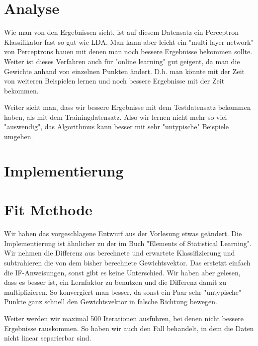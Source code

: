\section*{Analyse}
Wie man von den Ergebnissen sieht, ist auf diesem Datensatz ein Perceptron Klassifikator fast so gut wie LDA.
Man kann aber leicht ein "multi-layer network" von Perceptrons bauen mit denen man noch bessere Ergebnisse bekommen
sollte. Weiter ist dieses Verfahren auch für "online learning" gut geigent, da man die Gewichte anhand von einzelnen
Punkten ändert. D.h. man könnte mit der Zeit von weiteren Beispielen lernen und noch bessere Ergebnisse mit der Zeit
bekommen.

Weiter sieht man, dass wir bessere Ergebnisse mit dem Testdatensatz bekommen haben, als mit dem Trainingdatensatz. Also
wir lernen nicht mehr so viel "auswendig", das Algorithmus kann besser mit sehr "untypische" Beispiele umgehen.

\section*{Implementierung}

\section*{Fit Methode}

Wir haben das vorgeschlagene Entwurf aus der Vorlesung etwas geändert. Die Implementierung ist ähnlicher zu der im
Buch "Elements of Statistical Learning". Wir nehmen die Differenz aus berechnete und erwartete Klassifizierung und
subtrahieren die von dem bisher berechnete Gewichtsvektor. Das erstetzt einfach die IF-Anweisungen, sonst gibt es keine
Unterschied. Wir haben aber gelesen, dass es besser ist, ein Lernfaktor zu benutzen und die Differenz damit zu
multiplizieren. So konvergiert man besser, da sonst ein Paar sehr "untypische" Punkte ganz schnell den Gewichtsvektor
in falsche Richtung bewegen.

Weiter werden wir maximal 500 Iterationen ausführen, bei denen nicht bessere Ergebnisse rauskommen. So haben wir auch
den Fall behandelt, in dem die Daten nicht linear separierbar sind.

